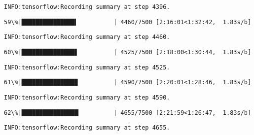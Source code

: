 \documentclass[11pt]{article}
\begin{document}
    \begin{Verbatim}[commandchars=\\\{\}]
INFO:tensorflow:Recording summary at step 4396.

    \end{Verbatim}

    \begin{Verbatim}[commandchars=\\\{\}]
 59\%|███████████████▍          | 4460/7500 [2:16:01<1:32:42,  1.83s/b]
    \end{Verbatim}

    \begin{Verbatim}[commandchars=\\\{\}]
INFO:tensorflow:Recording summary at step 4460.

    \end{Verbatim}

    \begin{Verbatim}[commandchars=\\\{\}]
 60\%|███████████████▋          | 4525/7500 [2:18:00<1:30:44,  1.83s/b]
    \end{Verbatim}

    \begin{Verbatim}[commandchars=\\\{\}]
INFO:tensorflow:Recording summary at step 4525.

    \end{Verbatim}

    \begin{Verbatim}[commandchars=\\\{\}]
 61\%|███████████████▉          | 4590/7500 [2:20:01<1:28:46,  1.83s/b]
    \end{Verbatim}

    \begin{Verbatim}[commandchars=\\\{\}]
INFO:tensorflow:Recording summary at step 4590.

    \end{Verbatim}

    \begin{Verbatim}[commandchars=\\\{\}]
 62\%|████████████████▏         | 4655/7500 [2:21:59<1:26:47,  1.83s/b]
    \end{Verbatim}

    \begin{Verbatim}[commandchars=\\\{\}]
INFO:tensorflow:Recording summary at step 4655.

    \end{Verbatim}
\end{document}
